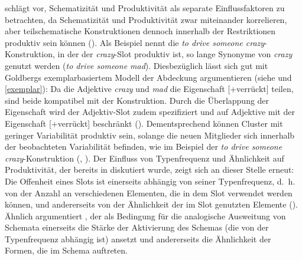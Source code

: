  \textcite[62]{Bybee.2013} schlägt vor, Schematizität und Produktivität als separate Einflussfaktoren zu betrachten, da Schematizität und Produktivität zwar miteinander korrelieren, aber teilschematische Konstruktionen dennoch innerhalb der Restriktionen produktiv sein können (\cite[62]{Bybee.2013}). Als Beispiel nennt \textcite[62]{Bybee.2013} die \textit{to drive some\-one crazy}-Konstruktion, in der der \textit{crazy}-Slot produktiv ist, so lange Synonyme von \textit{crazy} genutzt werden (\textit{to drive someone mad}). Diesbezüglich lässt sich gut mit Goldbergs exemplarbasiertem Modell der Abdeckung argumentieren (siehe  und \ref{exemplar}): Da die Adjektive \textit{crazy} und \textit{mad} die Eigenschaft [+verrückt] teilen, sind beide kompatibel mit der Konstruktion. Durch die Überlappung der Eigenschaft wird der Adjektiv-Slot zudem spezifiziert und auf Adjektive mit der Eigenschaft [+verrückt] beschränkt (\cite[72]{Goldberg.2019}). Dementsprechend können Cluster mit geringer Variabilität produktiv sein, solange die neuen Mitglieder sich innerhalb der beobachteten Variabilität befinden, wie im Beispiel der \textit{to drive someone crazy}-Konstruktion (\cite[67--69]{Bybee.2010}, \cite[65]{Goldberg.2019}).  Der Einfluss von Typenfrequenz und Ähnlichkeit auf Produktivität, der bereits in  diskutiert wurde, zeigt sich an dieser Stelle erneut: Die Offenheit eines Slots ist einerseits abhängig von seiner Typenfrequenz, d.~h. von der Anzahl an verschiedenen Elementen, die in dem Slot verwendet werden können, und andererseits von der Ähnlichkeit der im Slot genutzten Elemente (\cite[8]{BlumenthalDrame.2012}).  Ähnlich argumentiert \textcite[16]{Diessel.2017}, der als Bedingung für die analogische Ausweitung von Schemata einerseits die Stärke der Aktivierung des Schemas (die von der Typenfrequenz abhängig ist) ansetzt und andererseits die Ähnlichkeit der Formen, die im Schema auftreten. 


